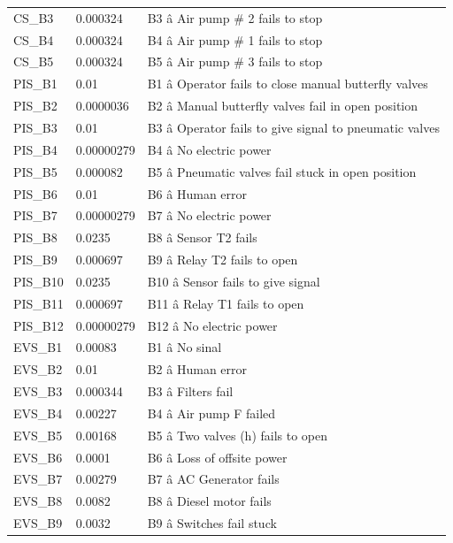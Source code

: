 \documentclass{article}
\begin{document}
\begin{longtable}{>{\raggedright\arraybackslash\hspace{0pt}}p{}>{\raggedright\arraybackslash\hspace{0pt}}p{}>{\raggedright\arraybackslash\hspace{0pt}}p{}}
CS\_\allowbreak{}B3 & 0.000324 & B3 â Air pump \# 2 fails to stop \\
CS\_\allowbreak{}B4 & 0.000324 & B4 â Air pump \# 1 fails to stop \\
CS\_\allowbreak{}B5 & 0.000324 & B5 â Air pump \# 3 fails to stop \\
PIS\_\allowbreak{}B1 & 0.01 & B1 â Operator fails to close manual butterfly valves \\
PIS\_\allowbreak{}B2 & 0.0000036 & B2 â Manual butterfly valves fail in open position \\
PIS\_\allowbreak{}B3 & 0.01 & B3 â Operator fails to give signal to pneumatic valves \\
PIS\_\allowbreak{}B4 & 0.00000279 & B4 â No electric power \\
PIS\_\allowbreak{}B5 & 0.000082 & B5 â Pneumatic valves fail stuck in open position \\
PIS\_\allowbreak{}B6 & 0.01 & B6 â Human error \\
PIS\_\allowbreak{}B7 & 0.00000279 & B7 â No electric power \\
PIS\_\allowbreak{}B8 & 0.0235 & B8 â Sensor T2 fails \\
PIS\_\allowbreak{}B9 & 0.000697 & B9 â Relay T2 fails to open \\
PIS\_\allowbreak{}B10 & 0.0235 & B10 â Sensor fails to give signal \\
PIS\_\allowbreak{}B11 & 0.000697 & B11 â Relay T1 fails to open \\
PIS\_\allowbreak{}B12 & 0.00000279 & B12 â No electric power \\
EVS\_\allowbreak{}B1 & 0.00083 & B1 â No sinal \\
EVS\_\allowbreak{}B2 & 0.01 & B2 â Human error \\
EVS\_\allowbreak{}B3 & 0.000344 & B3 â Filters fail \\
EVS\_\allowbreak{}B4 & 0.00227 & B4 â Air pump F failed \\
EVS\_\allowbreak{}B5 & 0.00168 & B5 â Two valves (\allowbreak{}h)\allowbreak{} fails to open \\
EVS\_\allowbreak{}B6 & 0.0001 & B6 â Loss of offsite power \\
EVS\_\allowbreak{}B7 & 0.00279 & B7 â AC Generator fails \\
EVS\_\allowbreak{}B8 & 0.0082 & B8 â Diesel motor fails \\
EVS\_\allowbreak{}B9 & 0.0032 & B9 â Switches fail stuck \\

\end{longtable}
\end{document}
